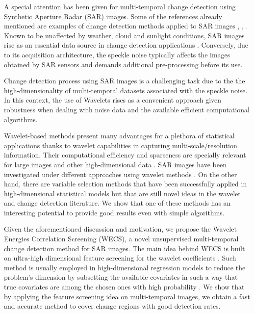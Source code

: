 \documentclass[journal]{IEEEtran}
\begin{document}
A special attention has been given for multi-temporal change detection using Synthetic Aperture Radar (SAR) images. 
Some of the references already mentioned are examples of change detection methods applied to SAR images \cite{barreto2016deforestation,ban2012multitemporal,scher2021mapping,quin2014mimosa}, \cite{jia2018novel}, \cite{hou2014unsupervised}. Known to be unaffected by weather, cloud and sunlight conditions, SAR images rise as an essential data source in change detection applications \cite{bovolo2005detail}. Conversely, due to its acquisition architecture, the speckle noise typically affects the images obtained by SAR sensors and demands additional pre-processing before its use.

Change detection process using SAR images is a challenging task due to the the high-dimensionality of multi-temporal datasets associated with the speckle noise. In this context, the use of Wavelets rises as a convenient approach given robustness when dealing with noise data and the available efficient computational algorithms.

Wavelet-based methods present many advantages for a plethora of statistical applications \cite{vidakovic1999statistical} thanks to wavelet capabilities in capturing multi-scale/resolution information. 
Their computational efficiency and sparseness are specially relevant for large images and other high-dimensional data \cite{morettin2017wavelets}. 
SAR images have been investigated under different approaches using wavelet methods \cite{atto2012multidate,bouhlel2015multivariate,celik2009multiscale,cui2012statistical}. 
On the other hand, there are variable selection methods that have been successfully applied in high-dimensional statistical models but that are still novel ideas in the wavelet and change detection literature. We show that one of these methods has an interesting potential to provide good results even with simple algorithms.


Given the aforementioned discussion and motivation, we propose the Wavelet Energies Correlation Screening (WECS), a novel unsupervised multi-temporal change detection method for SAR images.
%
The main idea behind WECS is built on ultra-high dimensional feature screening for the wavelet coefficients \cite{fan2020statistical}. Such method is usually employed in high-dimensional regression models to reduce the problem's dimension by subsetting the available covariates in such a way that true covariates are among the chosen ones with high probability \cite{fan2008sure}. We show that by applying the feature screening idea on multi-temporal images, we obtain a fast and accurate method to cover change regions with good detection rates.
\end{document}
